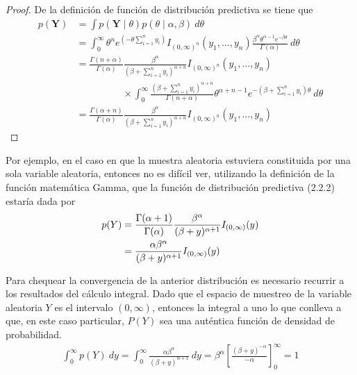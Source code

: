     \begin{proof}
    De la definici\'on de funci\'on de distribuci\'on predictiva se tiene que
    \begin{align*}
    p(\mathbf{Y})&=\int p(\mathbf{Y} \mid \theta)p(\theta \mid \alpha,\beta)\ d\theta\\
    &=\int_0^{\infty}\theta^n e^{(-\theta \sum_{i=1}^ny_i)}I_{(0,\infty)^n}(y_1,\ldots,y_n)\frac{\beta^\alpha \theta^{\alpha-1} e^{-\beta\theta}}{\Gamma(\alpha)} \ d\theta\\
    &=\frac{\Gamma(n+\alpha)}{\Gamma(\alpha)}\frac{\beta^\alpha}{(\beta+\sum_{i=1}^ny_i)^{\alpha+n}}I_{(0,\infty)^n}(y_1,\ldots,y_n)\\
    &\hspace{2cm}\times
    \int_0^{\infty} \frac{(\beta+\sum_{i=1}^ny_i)^{\alpha+n}}{\Gamma(n+\alpha)} \theta^{\alpha+n-1}e^{-(\beta+\sum_{i=1}^ny_i)\theta}
    \ d\theta\\
    &=\frac{\Gamma(\alpha+n)}{\Gamma(\alpha)}\frac{\beta^\alpha}{(\beta+\sum_{i=1}^ny_i)^{\alpha+n}}I_{(0,\infty)^n}(y_1,\ldots,y_n)
    \end{align*}
    \end{proof}
    
    Por ejemplo, en el caso en que la muestra aleatoria estuviera constituida por una sola variable aleatoria, entonces no es dif\'icil ver, utilizando la definici\'on de la funci\'on matem\'atica Gamma, que la funci\'on de distribuci\'on predictiva (2.2.2) estar\'ia dada por
    \begin{align*}
    p(Y)&=\frac{\Gamma(\alpha+1)}{\Gamma(\alpha)}\frac{\beta^\alpha}{(\beta+y)^{\alpha+1}}
    I_{(0,\infty)}(y)\notag \\
    &=\frac{\alpha \beta^\alpha}{(\beta+y)^{\alpha+1}}
    I_{(0,\infty)}(y)
    \end{align*}
    
    Para chequear la convergencia de la anterior distribuci\'on es necesario recurrir a los resultados del c\'alculo integral. Dado que el espacio de muestreo de la variable aleatoria $Y$ es el intervalo $(0,\infty)$, entonces la integral a uno lo que conlleva a que, en este caso particular, $P(Y)$ sea una aut\'entica funci\'on de densidad de probabilidad.
    \begin{align*}
    \int_0^{\infty}p(Y)\ dy=\int_0^{\infty}\frac{\alpha \beta^\alpha}{(\beta+y)^{\alpha+1}} \ dy
    =  \beta^\alpha \left[\frac{(\beta+y)^{-\alpha}}{-\alpha} \right]_0^{\infty}
    =1
    \end{align*}
    
